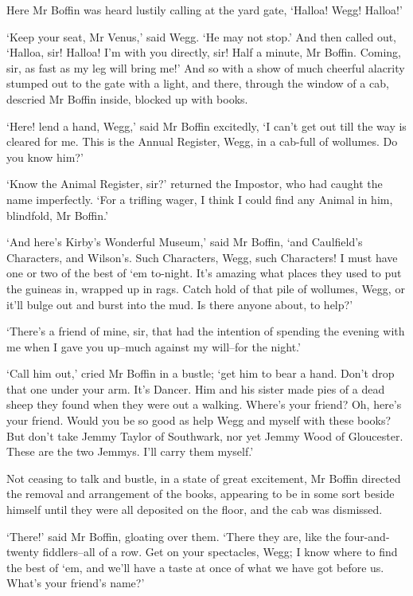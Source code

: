 Here Mr Boffin was heard lustily calling at the yard gate, ‘Halloa!
Wegg! Halloa!’

‘Keep your seat, Mr Venus,’ said Wegg. ‘He may not stop.’ And then
called out, ‘Halloa, sir! Halloa! I’m with you directly, sir! Half a
minute, Mr Boffin. Coming, sir, as fast as my leg will bring me!’ And
so with a show of much cheerful alacrity stumped out to the gate with
a light, and there, through the window of a cab, descried Mr Boffin
inside, blocked up with books.

‘Here! lend a hand, Wegg,’ said Mr Boffin excitedly, ‘I can’t get out
till the way is cleared for me. This is the Annual Register, Wegg, in a
cab-full of wollumes. Do you know him?’

‘Know the Animal Register, sir?’ returned the Impostor, who had caught
the name imperfectly. ‘For a trifling wager, I think I could find any
Animal in him, blindfold, Mr Boffin.’

‘And here’s Kirby’s Wonderful Museum,’ said Mr Boffin, ‘and Caulfield’s
Characters, and Wilson’s. Such Characters, Wegg, such Characters! I must
have one or two of the best of ‘em to-night. It’s amazing what places
they used to put the guineas in, wrapped up in rags. Catch hold of that
pile of wollumes, Wegg, or it’ll bulge out and burst into the mud. Is
there anyone about, to help?’

‘There’s a friend of mine, sir, that had the intention of spending
the evening with me when I gave you up--much against my will--for the
night.’

‘Call him out,’ cried Mr Boffin in a bustle; ‘get him to bear a hand.
Don’t drop that one under your arm. It’s Dancer. Him and his sister made
pies of a dead sheep they found when they were out a walking. Where’s
your friend? Oh, here’s your friend. Would you be so good as help Wegg
and myself with these books? But don’t take Jemmy Taylor of Southwark,
nor yet Jemmy Wood of Gloucester. These are the two Jemmys. I’ll carry
them myself.’

Not ceasing to talk and bustle, in a state of great excitement, Mr
Boffin directed the removal and arrangement of the books, appearing
to be in some sort beside himself until they were all deposited on the
floor, and the cab was dismissed.

‘There!’ said Mr Boffin, gloating over them. ‘There they are, like the
four-and-twenty fiddlers--all of a row. Get on your spectacles, Wegg;
I know where to find the best of ‘em, and we’ll have a taste at once of
what we have got before us. What’s your friend’s name?’

